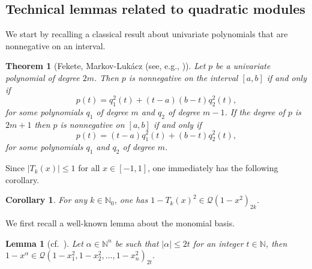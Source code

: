 \documentclass[11pt]{article}
\newcommand{\N}{\mathbb{N}}
\newtheorem{theorem}{Theorem}
\newtheorem{corollary}[defin]{Corollary}
\newtheorem{lemma}[defin]{Lemma}
\theoremstyle{definition}
\begin{document}
\subsection{Technical lemmas related to quadratic modules}
We start by recalling a classical result about univariate polynomials that are nonnegative on an interval.

\begin{theorem}[Fekete, Markov-Luk\'acz (see, e.g., \cite{3f4f597f-caa0-3104-a850-33b8de850a7c})]\label{THM:MarkovLukacz}
Let $p$ be a univariate polynomial of degree
$2m$. Then $p$ is nonnegative on the interval $[a,b]$ if and
only if
\[
{
 p(t)=q_1^2(t)+(t-a)(b-t)q_2^2(t),}
\]
for some polynomials $q_1$ of degree $m$ and $q_2$ of degree $m-1$.
If the degree of $p$ is $2m+1$ then $p$ is
nonnegative on $[a,b]$ if and only if
\[
 p(t)=(t-a)q_1^2(t)+(b-t)q_2^2(t),
\]
for some polynomials $q_1$ and $q_2$ of degree $m$.
\end{theorem}

Since $|T_k(x)| \le 1$ for all $x \in [-1,1]$, one immediately has the following corollary.
\begin{corollary}
For any $k \in \mathbb{N}_0$, one has $1-T_k(x)^2 \in \mathcal Q(1-x^2)_{2k}$. \label{lem:univar}
\end{corollary}

We first recall a well-known lemma about the monomial basis.

\begin{lemma}[{cf.~\cite[Lemma 23]{10.1145/3597066.3597075}}]
    Let $\alpha \in \N^n$ be such that $|\alpha| \leq 2t$ for an integer $t \in \N$, then
    $
    1-x^\alpha \in \mathcal Q(1-x_1^2,1-x_2^2,\ldots, 1-x_n^2)_{2t}.
    $
\end{lemma}
\end{document}
